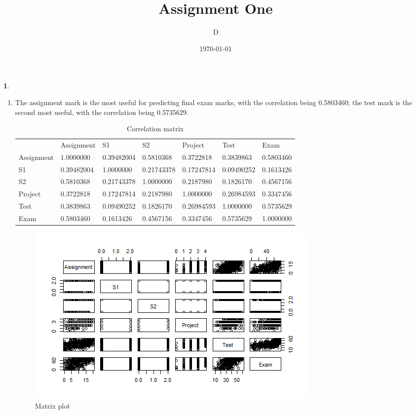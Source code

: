 \documentclass[10pt]{article}
\author{D}
\newtheorem{prob}{\bm{$Problem$}}
\begin{document}
\title{Assignment One}
\date{\today}
\maketitle
\thispagestyle{fancy}
\thispagestyle{fancy}

\newpage

\begin{prob}
\end{prob}
\begin{enumerate}[1)]
\vspace{3mm}

\item
The assignment mark is the most useful for predicting final exam marks, with the correlation being 0.5803460; the test mark is the second most useful, with the correlation being 0.5735629.
\begin{table}[H]
\centering
\tiny
\begin{tabular}{lllllll}
           & Assignment & S1         & S2         & Project    & Test       & Exam      \\
Assignment & 1.0000000  & 0.39482004 & 0.5810368  & 0.3722818  & 0.3839863  & 0.5803460 \\
S1         & 0.39482004 & 1.0000000  & 0.21743378 & 0.17247814 & 0.09490252 & 0.1613426 \\
S2         & 0.5810368  & 0.21743378 & 1.0000000  & 0.2187980  & 0.1826170  & 0.4567156 \\
Project    & 0.3722818  & 0.17247814 & 0.2187980  & 1.0000000  & 0.26984593 & 0.3347456 \\
Test       & 0.3839863  & 0.09490252 & 0.1826170  & 0.26984593 & 1.0000000  & 0.5735629 \\
Exam       & 0.5803460  & 0.1613426  & 0.4567156  & 0.3347456  & 0.5735629  & 1.0000000
\end{tabular}
\caption{Correlation matrix}
\end{table}
\begin{figure}[H]
  \centering
  \includegraphics[scale=0.45]{p11a.png}
  \caption{Matrix plot}
\end{figure}


\end{enumerate}
\end{document}
